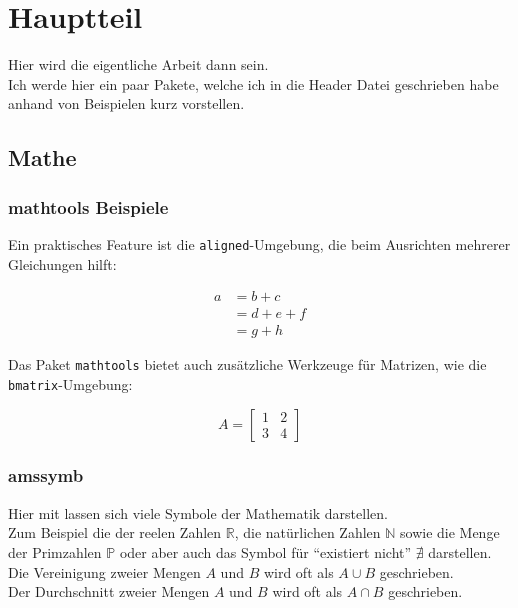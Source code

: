 \chapter{Hauptteil}\label{chapter:hauptteil}
Hier wird die eigentliche Arbeit dann sein. \\
Ich werde hier ein paar Pakete, welche ich in die Header Datei geschrieben habe anhand von Beispielen kurz vorstellen.\\

\section{Mathe}
\subsection{mathtools Beispiele}

Ein praktisches Feature ist die \texttt{aligned}-Umgebung, die beim Ausrichten mehrerer Gleichungen hilft:

 \begin{equation}
 \begin{aligned}
     a &= b + c \\
     &= d + e + f \\
     &= g + h
 \end{aligned}
 \end{equation}

 Das Paket \texttt{mathtools} bietet auch zusätzliche Werkzeuge für Matrizen, wie die \texttt{bmatrix}-Umgebung:

 \begin{equation}
     A = \begin{bmatrix}
         1 & 2 \\
         3 & 4
     \end{bmatrix}
 \end{equation}

 \newpage

\subsection{amssymb}

Hier mit lassen sich viele Symbole der Mathematik darstellen. \\
Zum Beispiel die der reelen Zahlen $\mathbb{R}$, die natürlichen Zahlen  $\mathbb{N}$ sowie die Menge der Primzahlen $\mathbb{P}$ oder aber auch das Symbol für \enquote{existiert nicht} $\nexists$ darstellen. \\
Die Vereinigung zweier Mengen $A$ und $B$ wird oft als $A \cup B$ geschrieben. \\
Der Durchschnitt zweier Mengen $A$ und $B$ wird oft als $A \cap B$ geschrieben. \\

